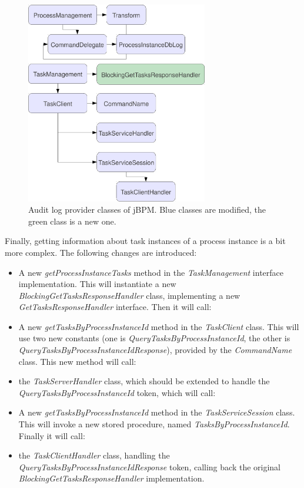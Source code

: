 \begin{figure}[p]
\centering
\includegraphics[width=300px,keepaspectratio]{jbpm-modified-classes.pdf}
\caption{Audit log provider classes of jBPM. Blue classes are modified, the green class is a new one.}
\label{fig:jbpm-modified-classes}
\end{figure}

Finally, getting information about task instances of a process instance is a
bit more complex. The following changes are introduced:

\begin{itemize}
\item A new \emph{getProcessInstanceTasks} method in the \emph{TaskManagement}
	interface implementation. This will instantiate a new
	\emph{BlockingGetTasksResponseHandler} class, implementing a new
	\emph{GetTasksResponseHandler} interface. Then it will call:
\item A new \emph{getTasksByProcessInstanceId} method in the \emph{TaskClient} class. This will use two new constants (one is \emph{QueryTasksByProcessInstanceId}, the other is \emph{QueryTasksByProcessInstanceIdResponse}), provided by the \emph{CommandName} class. This new method will call:
\item the \emph{TaskServerHandler} class, which should be extended to handle the \emph{QueryTasksByProcessInstanceId} token, which will call:
\item A new \emph{getTasksByProcessInstanceId} method in the \emph{TaskServiceSession} class. This will invoke a new stored procedure, named \emph{TasksByProcessInstanceId}. Finally it will call:
\item the \emph{TaskClientHandler} class, handling the \emph{QueryTasksByProcessInstanceIdResponse} token, calling back the original \emph{BlockingGetTasksResponseHandler} implementation.
\end{itemize}

